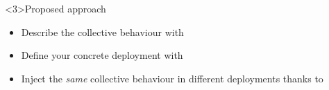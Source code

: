 \begin{frame}<3>{Proposed approach}
  \begin{cardTiny}
    \begin{itemize}
      \item<1-> Describe the collective behaviour with ~\cite{DBLP:journals/jlap/ViroliBDACP19}
      \item<2-> Define your concrete deployment with ~\cite{DBLP:journals/csur/WeisenburgerWS20}
      \item<3-> Inject the \textit{same} collective behaviour in different deployments thanks to ~\cite{DBLP:journals/fi/CasadeiPPVW20}
    \end{itemize}
  \end{cardTiny}
  \begin{columns}[onlytextwidth, t]
    \begin{column}{0.27\textwidth}
      \begin{adjustbox}{max width=\textwidth, valign=m, margin=0}
      \end{adjustbox}
    \end{column}
    \begin{column}{0.32\textwidth}
      \begin{adjustbox}{max width=\textwidth, valign=m}
      \end{adjustbox}
    \end{column}
    \begin{column}{0.25\textwidth}
      \begin{adjustbox}{max width=\textwidth, valign=m}
      \end{adjustbox}
    \end{column}
  \end{columns}
\end{frame}